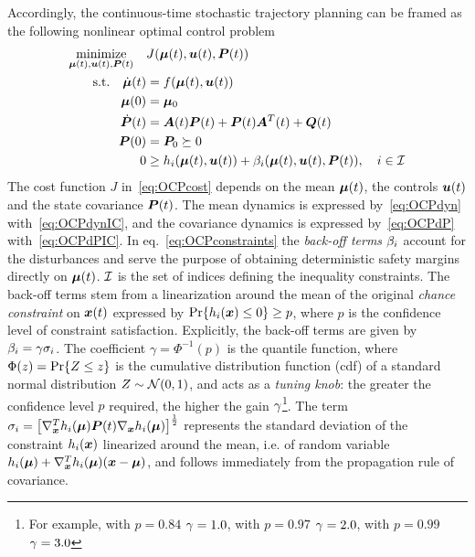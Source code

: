Accordingly, the continuous-time stochastic trajectory planning can be framed as the following nonlinear optimal control problem
\begin{subequations}\label{eq:OCP}
\begin{align}
	\underset{\bmu(t), \bu(t), \bP(t)}{\text{minimize}} \quad & J(\bmu(t), \bu(t), \bP(t)) \label{eq:OCPcost} \\
	\text{s.t.} \quad \dbmu(t)           &= f(\bmu(t), \bu(t)) \label{eq:OCPdyn} \\
	\phantom{\text{s.t.} \quad} \bmu(0)  &= \bmu_0 \label{eq:OCPdynIC} \\
	\phantom{\text{s.t.} \quad} \dbP(t) &= \bA(t) \bP(t) + \bP(t) \bA^T(t) + \bQ(t) \label{eq:OCPdP} \\
	\phantom{\text{s.t.} \quad} \bP(0)  &= \bP_0 \succeq 0 \label{eq:OCPdPIC} \\ %
	\phantom{\text{s.t.} \qquad} 0&       \geq h_i(\bmu(t), \bu(t))
	+ \be_i(\bmu(t), \bu(t), \bP(t)),
	\quad i \in \calI \label{eq:OCPconstraints}
\end{align}
\end{subequations}
The cost function $J$ in~\eqref{eq:OCPcost} depends on the mean $\boldsymbol{\mu}(t)$, the controls $\boldsymbol{u}(t)$ and the state covariance $\boldsymbol{P}(t)$. The mean dynamics is expressed by~\eqref{eq:OCPdyn} with~\eqref{eq:OCPdynIC}, and the covariance dynamics is expressed by~\eqref{eq:OCPdP} with~\eqref{eq:OCPdPIC}. In eq.~\eqref{eq:OCPconstraints} the \emph{back-off terms} $\beta_i$ account for the disturbances and serve the purpose of obtaining deterministic safety margins directly on $\boldsymbol{\mu}(t)$. $\mathcal{I}$ is the set of indices defining the inequality constraints. The back-off terms stem from a linearization around the mean of the original \emph{chance constraint} on $\boldsymbol{x}(t)$ expressed by $\operatorname{Pr} \{h_i(\boldsymbol{x}) \leq 0\}\geq p$, where $p$ is the confidence level of constraint satisfaction. Explicitly, the back-off terms are given by
$\beta_i = \gamma \sigma_i$. The coefficient $\gamma = \Phi^{-1}(p)$ is the quantile function, where $\Phi(z)=\operatorname{Pr} \{Z\leq z\}$ is the cumulative distribution function (cdf) of a standard normal distribution $Z \sim \mathcal{N}(0,1)$, and acts as a \emph{tuning knob}: the greater the confidence level $p$ required, the higher the gain $\gamma$\footnote{For example, with $p=0.84$ $\gamma = 1.0$, with $p=0.97$ $\gamma = 2.0$, with $p=0.99$ $\gamma = 3.0$}. The term $\sigma_i = \big[\nabla^T_{\boldsymbol{x}} h_i(\boldsymbol{\mu}) \boldsymbol{P}(t) \nabla_{\boldsymbol{x}} h_i(\boldsymbol{\mu})\big]^{\frac{1}{2}}$ represents the standard deviation of the constraint $h_i(\boldsymbol{x})$ linearized around the mean, i.e. of random variable $h_i(\boldsymbol{\mu})+\nabla^T_{\boldsymbol{x}} h_i(\boldsymbol{\mu}) (\boldsymbol{x} - \boldsymbol{\mu})$, and follows immediately from the propagation rule of covariance.

